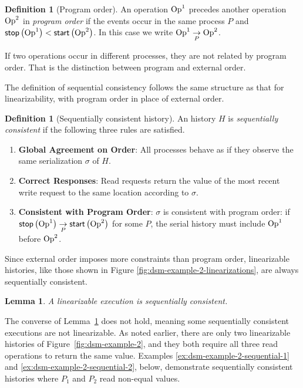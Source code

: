 \documentclass[]             %
{NASA}                       %
\newtheorem{lemma}[theorem]{Lemma}
\theoremstyle{definition}
\newtheorem{definition}[theorem]{Definition}
\providecommand{\tightlist}{%
  \setlength{\itemsep}{0pt}\setlength{\parskip}{0pt}}
\begin{document}
\begin{definition}[Program order]
  An operation $\mathrm{Op}^1$ precedes another operation $\mathrm{Op}^2$ in
  \emph{program order} if the events occur in the same process $P$ and
  $\mathsf{stop}\left(\mathrm{Op}^1\right) < \mathsf{start}\left(\mathrm{Op}^2\right)$. In this case we write
  $\mathrm{Op}^1 \underset{P}{\to} \mathrm{Op}^2$.
\end{definition}
If two operations occur in different processes, they are not related
by program order. That is the distinction between program and external
order.

The definition of sequential consistency follows the same structure as
that for linearizability, with program order in place of external
order.

\begin{definition}[Sequentially consistent history]
  \label{def:sequentially-consistent-history}
  An history $H$ is \emph{sequentially consistent} if the following
  three rules are satisfied.
\begin{enumerate}
  \tightlist
\item \textbf{Global Agreement on Order}: All processes behave as if
  they observe the same serialization $\sigma$ of $H$.
\item \textbf{Correct Responses}: Read requests return the value of
  the most recent write request to the same location according to $\sigma$.
\item \textbf{Consistent with Program Order}: $\sigma$ is consistent
  with program order: if
  $\mathsf{stop}\left(\mathrm{Op}^1\right) \underset{P}{\to} \mathsf{start}\left(\mathrm{Op}^2\right)$ for some $P$, the serial
  history must include $\mathrm{Op}^1$ before $\mathrm{Op}^2$.
\end{enumerate}
\end{definition}

Since external order imposes more constraints than program order,
linearizable histories, like those shown in Figure
\ref{fig:dsm-example-2-linearizations}, are always sequentially
consistent.
\begin{lemma}
  \label{lem:linearsequential}
  A linearizable execution is sequentially consistent.
\end{lemma}

The converse of Lemma~\ref{lem:linearsequential} does not hold,
meaning some sequentially consistent executions are not
linearizable. As noted earlier, there are only two linearizable
histories of Figure~\ref{fig:dsm-example-2}, and they both require all
three read operations to return the same value. Examples
\ref{ex:dsm-example-2-sequential-1} and
\ref{ex:dsm-example-2-sequential-2}, below, demonstrate sequentially
consistent histories where $P_1$ and $P_2$ read non-equal values.
\end{document}
